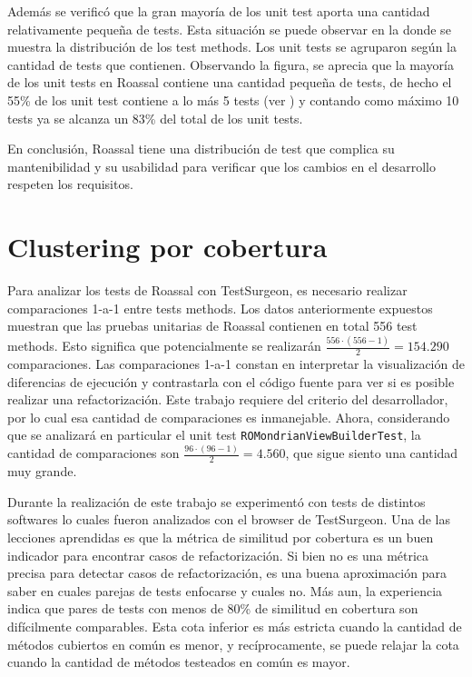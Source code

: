 \par Además se verificó que la gran mayoría de los unit test aporta una cantidad relativamente pequeña de tests. Esta situación se puede observar en la  donde se muestra la distribución de los test methods. Los unit tests se agruparon según la cantidad de tests que contienen. Observando la figura, se aprecia que la mayoría de los unit tests en Roassal contiene una cantidad pequeña de tests, de hecho el 55\% de los unit test contiene a lo más 5 tests (ver ) y contando como máximo 10 tests ya se alcanza un 83\% del total de los unit tests. 



\par En conclusión, Roassal tiene una distribución de test que complica su mantenibilidad y su usabilidad para verificar que los cambios en el desarrollo respeten los requisitos. 


\section{Clustering por cobertura}

\par Para analizar los tests de Roassal con TestSurgeon, es necesario realizar comparaciones 1-a-1 entre tests methods. Los datos anteriormente expuestos muestran que las pruebas unitarias de Roassal contienen en total 556 test methods. Esto significa que potencialmente se realizarán $\frac{556 \cdot \left(556 -1 \right)}{2} = 154.290$ comparaciones. Las comparaciones 1-a-1 constan en interpretar la visualización de diferencias de ejecución y contrastarla con el código fuente para ver si es posible realizar una refactorización. Este trabajo requiere del criterio del desarrollador, por lo cual esa cantidad de comparaciones es inmanejable. Ahora, considerando que se analizará en particular el unit test {\tt ROMondrianViewBuilderTest}, la cantidad de comparaciones son $\frac{96 \cdot \left(96 -1 \right)}{2} = 4.560$, que sigue siento una cantidad muy grande.

\par Durante la realización de este trabajo se experimentó con tests de distintos softwares lo cuales fueron analizados con el browser de TestSurgeon. Una de las lecciones aprendidas es que la métrica de similitud por cobertura es un buen indicador para encontrar casos de refactorización. Si bien no es una métrica precisa para detectar casos de refactorización, es una buena aproximación para saber en cuales parejas de tests enfocarse y cuales no. Más aun, la experiencia indica que pares de tests con menos de 80\% de similitud en cobertura son difícilmente comparables. Esta cota inferior es más estricta cuando la cantidad de métodos cubiertos en común es menor, y recíprocamente, se puede relajar la cota cuando la cantidad de métodos testeados en común es mayor. 

